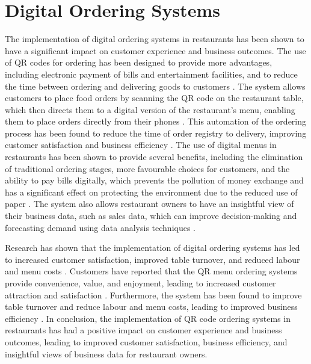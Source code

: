 \section{Digital Ordering Systems}
The implementation of digital ordering systems in restaurants has been shown to have a significant impact on customer experience and business outcomes. The use of QR codes for ordering has been designed to provide more advantages, including electronic payment of bills and entertainment facilities, and to reduce the time between ordering and delivering goods to customers \cite{6}. The system allows customers to place food orders by scanning the QR code on the restaurant table, which then directs them to a digital version of the restaurant's menu, enabling them to place orders directly from their phones \cite{2}. This automation of the ordering process has been found to reduce the time of order registry to delivery, improving customer satisfaction and business efficiency \cite{6}.
The use of digital menus in restaurants has been shown to provide several benefits, including the elimination of traditional ordering stages, more favourable choices for customers, and the ability to pay bills digitally, which prevents the pollution of money exchange and has a significant effect on protecting the environment due to the reduced use of paper \cite{6}. The system also allows restaurant owners to have an insightful view of their business data, such as sales data, which can improve decision-making and forecasting demand using data analysis techniques \cite{2}.

Research has shown that the implementation of digital ordering systems has led to increased customer satisfaction, improved table turnover, and reduced labour and menu costs \cite{5}. Customers have reported that the QR menu ordering systems provide convenience, value, and enjoyment, leading to increased customer attraction and satisfaction \cite{5}. Furthermore, the system has been found to improve table turnover and reduce labour and menu costs, leading to improved business efficiency \cite{5}.
In conclusion, the implementation of QR code ordering systems in restaurants has had a positive impact on customer experience and business outcomes, leading to improved customer satisfaction, business efficiency, and insightful views of business data for restaurant owners.


